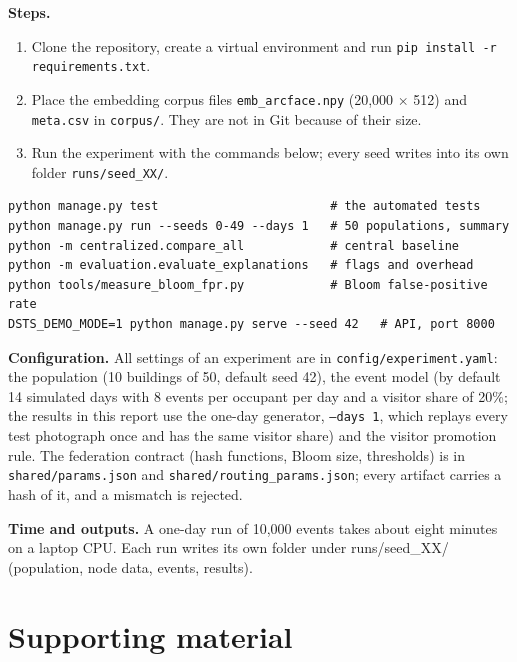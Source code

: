 \documentclass[12pt,a4paper,oneside]{report}
\begin{document}
\textbf{Steps.}
\begin{enumerate}
\item Clone the repository, create a virtual environment and run \texttt{pip install -r requirements.txt}.
\item Place the embedding corpus files \texttt{emb\_\allowbreak arcface.npy} (20,000 $\times$ 512) and \texttt{meta.csv} in \texttt{corpus/}. They are not in Git because of their size.
\item Run the experiment with the commands below; every seed writes into its own folder \texttt{runs/seed\_\allowbreak XX/}.
\end{enumerate}
\begin{footnotesize}
\begin{verbatim}
python manage.py test                        # the automated tests
python manage.py run --seeds 0-49 --days 1   # 50 populations, summary
python -m centralized.compare_all            # central baseline
python -m evaluation.evaluate_explanations   # flags and overhead
python tools/measure_bloom_fpr.py            # Bloom false-positive rate
DSTS_DEMO_MODE=1 python manage.py serve --seed 42   # API, port 8000
\end{verbatim}
\end{footnotesize}



\textbf{Configuration.} All settings of an experiment are in \texttt{config/experiment.yaml}: the population (10 buildings of 50, default seed 42), the event model (by default 14 simulated days with 8 events per occupant per day and a visitor share of 20\%; the results in this report use the one-day generator, \texttt{--days 1}, which replays every test photograph once and has the same visitor share) and the visitor promotion rule. The federation contract (hash functions, Bloom size, thresholds) is in \texttt{shared/params.json} and \texttt{shared/routing\_\allowbreak params.json}; every artifact carries a hash of it, and a mismatch is rejected.

\textbf{Time and outputs.} A one-day run of 10,000 events takes about eight minutes on a laptop CPU. Each run writes its own folder under runs/seed\_\allowbreak XX/ (population, node data, events, results).

\section{Supporting material}
\end{document}
